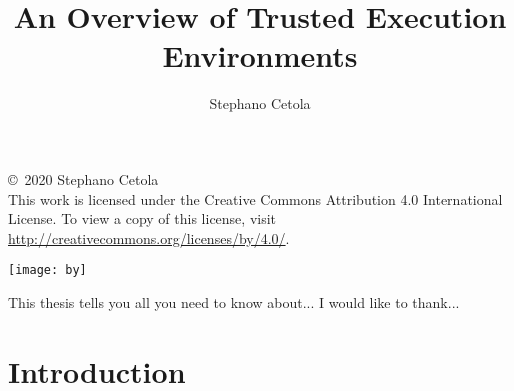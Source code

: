 \documentclass[12pt,oneside,letterpaper]{PSUreport}
\begin{document}
\title{An Overview of Trusted Execution Environments}
\subtitle{}
\author{Stephano Cetola}
\submitdate{\today}                                    %

\copyrightfalse
\figurespagetrue
\tablespagefalse
\null\vfill
\begin{center}
        \copyright\ 2020 Stephano Cetola \\
        This work is licensed under the Creative Commons Attribution 4.0 International License. To view a copy of this license, visit \url{http://creativecommons.org/licenses/by/4.0/}.
\end{center}
\begin{center}
\texttt{[image: by]}
\end{center}
\vfill\newpage
 
\beforepreface
{}
This thesis tells you all you need to know about...
I would like to thank...
\afterpreface

\printnoidxglossary[type=\acronymtype]

\glsresetall
\chapter{Introduction}




\end{document}
